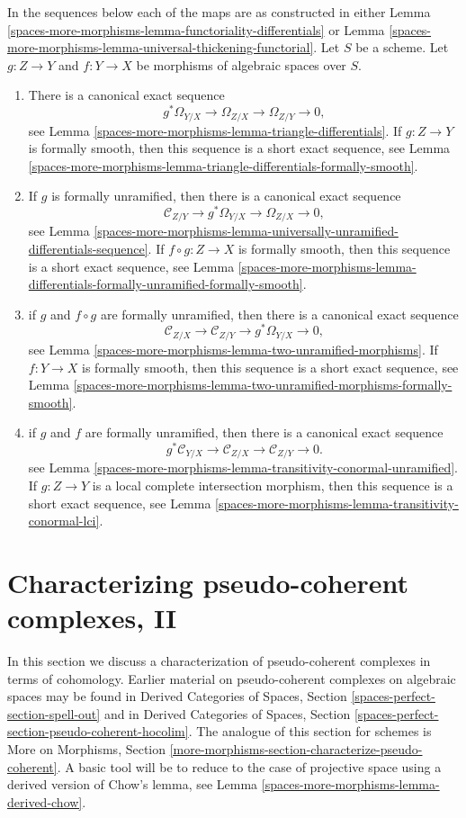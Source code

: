 \medskip\noindent
In the sequences below each of the maps
are as constructed in either
Lemma \ref{spaces-more-morphisms-lemma-functoriality-differentials} or
Lemma \ref{spaces-more-morphisms-lemma-universal-thickening-functorial}.
Let $S$ be a scheme. Let $g : Z \to Y$ and $f : Y \to X$ be morphisms of
algebraic spaces over $S$.
\begin{enumerate}
\item There is a canonical exact sequence
$$
g^*\Omega_{Y/X} \to \Omega_{Z/X} \to \Omega_{Z/Y} \to 0,
$$
see
Lemma \ref{spaces-more-morphisms-lemma-triangle-differentials}.
If $g : Z \to Y$ is formally smooth, then this sequence is a short
exact sequence, see
Lemma \ref{spaces-more-morphisms-lemma-triangle-differentials-formally-smooth}.
\item If $g$ is formally unramified, then there is a canonical exact sequence
$$
\mathcal{C}_{Z/Y} \to g^*\Omega_{Y/X} \to \Omega_{Z/X} \to 0,
$$
see
Lemma \ref{spaces-more-morphisms-lemma-universally-unramified-differentials-sequence}.
If $f \circ g : Z \to X$ is formally smooth, then this sequence is a short
exact sequence, see
Lemma \ref{spaces-more-morphisms-lemma-differentials-formally-unramified-formally-smooth}.
\item if $g$ and $f \circ g$ are formally unramified, then there is a
canonical exact sequence
$$
\mathcal{C}_{Z/X} \to \mathcal{C}_{Z/Y} \to g^*\Omega_{Y/X} \to 0,
$$
see
Lemma \ref{spaces-more-morphisms-lemma-two-unramified-morphisms}.
If $f : Y \to X$ is formally smooth, then this sequence is a short
exact sequence, see
Lemma \ref{spaces-more-morphisms-lemma-two-unramified-morphisms-formally-smooth}.
\item if $g$ and $f$ are formally unramified, then there is a canonical
exact sequence
$$
g^*\mathcal{C}_{Y/X} \to \mathcal{C}_{Z/X} \to \mathcal{C}_{Z/Y} \to 0.
$$
see
Lemma \ref{spaces-more-morphisms-lemma-transitivity-conormal-unramified}.
If $g : Z \to Y$ is a local complete intersection morphism,
then this sequence is a short exact sequence, see
Lemma \ref{spaces-more-morphisms-lemma-transitivity-conormal-lci}.
\end{enumerate}

\section{Characterizing pseudo-coherent complexes, II}
\label{spaces-more-morphisms-section-characterize-pseudo-coherent}
In this section we discuss a characterization of pseudo-coherent complexes
in terms of cohomology. Earlier material on pseudo-coherent complexes
on algebraic spaces may be found in
Derived Categories of Spaces, Section
\ref{spaces-perfect-section-spell-out}
and in
Derived Categories of Spaces, Section
\ref{spaces-perfect-section-pseudo-coherent-hocolim}.
The analogue of this section for schemes is More on Morphisms, Section
\ref{more-morphisms-section-characterize-pseudo-coherent}.
A basic tool will be to reduce to the case of projective space
using a derived version of Chow's lemma, see
Lemma \ref{spaces-more-morphisms-lemma-derived-chow}.

